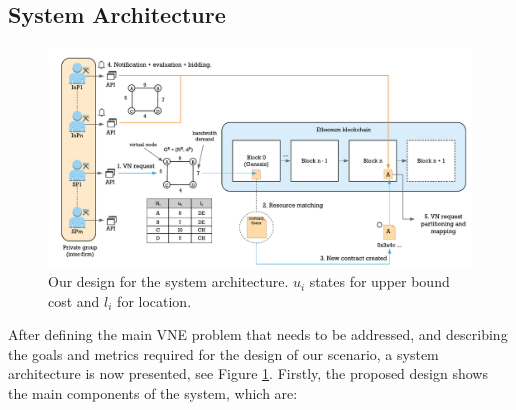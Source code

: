 \subsection{System Architecture}

\begin{figure}[bth]
	\centering
	\includegraphics[width=1\linewidth]{gfx/designWorkflow}    
  	\caption{Our design for the system architecture. $u_i$ states for upper bound cost and $l_i$ for location.}
  	\label{fig:designWorkflow}
\end{figure}

After defining the main VNE problem that needs to be addressed, and describing the goals and metrics required for the design of our scenario, a system architecture is now presented, see Figure \ref{fig:designWorkflow}. Firstly, the proposed design shows the main components of the system, which are:

